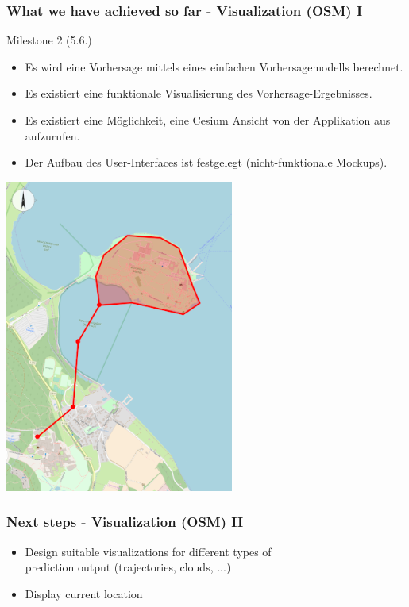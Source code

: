 \documentclass[xcolor=dvipsnames]{beamer}
\begin{document}
\begin{frame}
	\frametitle{What we have achieved so far - Visualization (OSM) I}
	\large{Milestone 2 (5.6.)}
	\normalsize
	\begin{itemize} 
		\item \color{LightGray}Es wird eine Vorhersage mittels eines einfachen Vorhersagemodells berechnet.
		\item \color{Green}Es existiert eine funktionale Visualisierung des Vorhersage-Ergebnisses.
		\item \color{LightGray}Es existiert eine Möglichkeit, eine Cesium Ansicht von der Applikation aus aufzurufen.
		\item \color{LightGray}Der Aufbau des User-Interfaces ist festgelegt (nicht-funktionale Mockups).
	\end{itemize} 
	\includegraphics{VisualizationFunctional}
\end{frame}


\begin{frame}
	\frametitle{Next steps - Visualization (OSM) II}
	\begin{itemize} 
		\item Design suitable visualizations for different types of\\ prediction output (trajectories, clouds, ...)
		\item Display current location
	\end{itemize} 
\end{frame}
\end{document}
